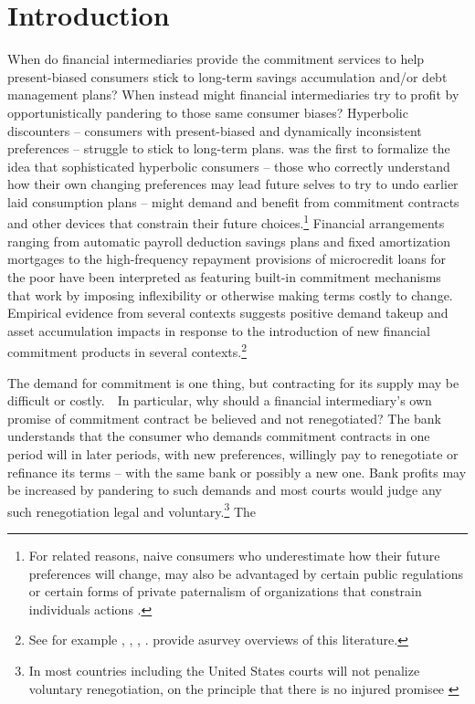 \documentclass[11pt,english]{article}
\theoremstyle{plain}
\theoremstyle{definition}
\begin{document}
\section{Introduction}


 When do financial intermediaries provide the commitment services to help present-biased consumers stick to long-term savings accumulation and/or debt management
plans? When instead might financial intermediaries try to profit by opportunistically pandering to those same consumer biases?
Hyperbolic discounters --{} consumers with present-biased
and dynamically inconsistent preferences -- struggle to stick to long-term plans.  \citet{strotz1956} was the first to formalize the idea that sophisticated hyperbolic consumers -- those who correctly understand how their own  changing preferences may lead future selves to try to  undo earlier laid consumption plans -- might demand and benefit from commitment  contracts and other devices that constrain their future choices.\footnote{For related reasons,  naive consumers who underestimate how their future preferences  will change, may also be advantaged by certain public regulations or certain forms of private paternalism of organizations  that constrain individuals  actions \citep{spiegler2011}.}  Financial arrangements ranging from automatic payroll deduction  savings plans and fixed amortization mortgages to the high-frequency repayment
provisions of microcredit loans for the poor
have been interpreted as featuring built-in commitment mechanisms that work by imposing inflexibility or otherwise making terms costly to change. 
 Empirical evidence from several contexts suggests positive demand takeup and asset accumulation impacts in response to the introduction of new financial commitment
products in several contexts.\footnote{See for example  \citet{ariely_procrastination_2002}, \citet{thaler2004}, \citet{ashraf_tying_2006}, \citet{bauer_behavioral_2012}.  \citet{bryan2010} provide asurvey overviews of this literature.}  



The demand for commitment is one thing, but contracting for its supply may be difficult or costly.\ \ In particular, why should a financial intermediary's own promise of commitment contract be believed and not renegotiated? The bank understands that the consumer who demands commitment contracts in one period will in later periods, with new preferences,  willingly  pay to renegotiate or refinance its terms -- with the same bank or possibly a new one. Bank
profits may be increased by pandering to such demands and most courts would judge any such renegotiation legal and voluntary.\footnote{In most countries including the United States courts will not penalize voluntary renegotiation, on the principle that there is no injured promisee \citep[see discussion in][p448]{laibson1997}} The    
\end{document}
